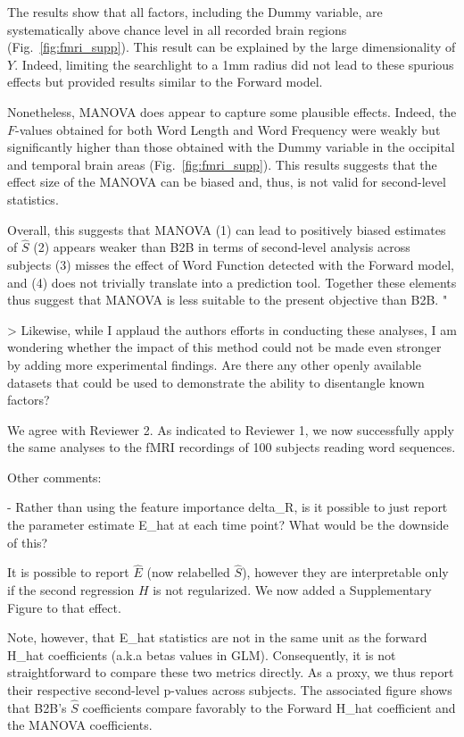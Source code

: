 The results show that all factors, including the Dummy variable, are
systematically above chance level in all recorded brain regions (Fig.~\ref{fig:fmri_supp}). This result
can be explained by the large dimensionality of $Y$. Indeed, limiting the
searchlight to a 1mm radius did not lead to these spurious effects but provided
results similar to the Forward model.

Nonetheless, MANOVA does appear to capture some plausible effects. Indeed, the
$F$-values obtained for both Word Length and Word Frequency were weakly but
significantly higher than those obtained with the Dummy variable in the
occipital and temporal brain areas (Fig.~\ref{fig:fmri_supp}). This results
suggests that the effect size of the MANOVA can be biased and, thus, is not
valid for second-level statistics.

Overall, this suggests that MANOVA (1) can lead to positively biased estimates of
$\hat S$ (2) appears weaker than B2B in terms of second-level analysis across
subjects (3) misses the effect of Word Function detected with the Forward model,
and (4) does not trivially translate into a prediction tool. Together these
elements thus suggest that MANOVA is less suitable to the present objective than
B2B.
"

> Likewise, while I applaud the authors efforts in conducting these analyses,
    I am wondering whether the impact of this method could not be made even
    stronger by adding more experimental findings. Are there any other openly
    available datasets that could be used to demonstrate the ability to
    disentangle known factors?

We agree with Reviewer 2. As indicated to Reviewer 1, we now successfully apply
the same analyses to the fMRI recordings of 100 subjects reading word sequences.

Other comments:

- Rather than using the feature importance delta_R, is it possible to just
    report the parameter estimate E_hat at each time point? What would be the
    downside of this?

It is possible to report $\hat E$ (now relabelled $\hat S$), however they are
interpretable only if the second regression $H$ is not regularized.
We now added a Supplementary Figure to that effect.

Note, however, that E_hat statistics are not in the same unit as the forward H_hat
coefficients (a.k.a betas values in GLM). Consequently, it is not straightforward to
compare these two metrics directly. As a proxy, we thus report their respective
second-level p-values across subjects. The associated figure shows that B2B's $\hat S$
coefficients compare favorably to the Forward H_hat coefficient and the MANOVA
coefficients.

